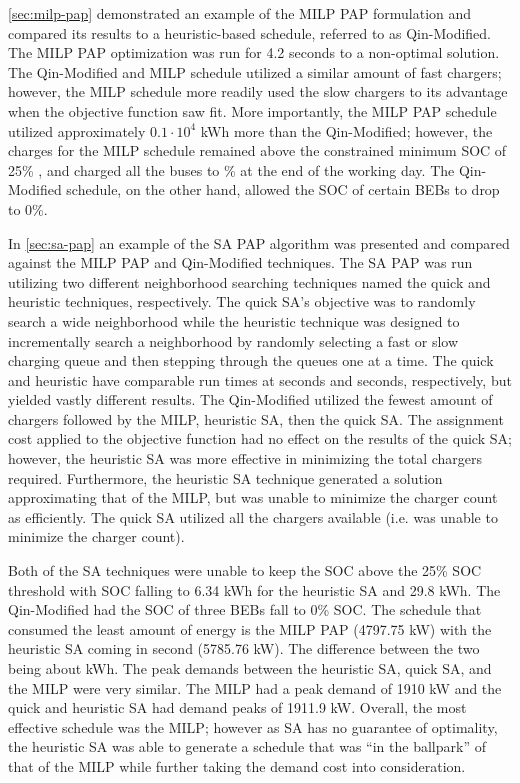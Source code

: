 \documentclass[ee,thesis]{usuthesis}
\newcommand{\bcharge}{0.7 }                                                     %
\newcommand{\mincharge}{25\% }                                                  %
\newcommand{\tempcnt}{9101 }                                                    %
\newcommand{\quicklocal}{0.25 }                                                %
\newcommand{\heuristiclocal}{0.4 }                                             %
\newcommand{\timeran}{4.2 }                                                    %
\begin{document}
\ref{sec:milp-pap} demonstrated an example of the MILP PAP formulation and compared its results to a heuristic-based
schedule, referred to as Qin-Modified. The MILP PAP optimization was run for \timeran seconds to a non-optimal solution.
The Qin-Modified and MILP schedule utilized a similar amount of fast chargers; however, the MILP schedule more readily
used the slow chargers to its advantage when the objective function saw fit. More importantly, the MILP PAP schedule
utilized approximately \(0.1\cdot10^4\) kWh more than the Qin-Modified; however, the charges for the MILP schedule remained
above the constrained minimum SOC of \mincharge, and charged all the buses to \fpeval{\bcharge *100}\% at the end of the
working day. The Qin-Modified schedule, on the other hand, allowed the SOC of certain BEBs to drop to 0\%.

In \ref{sec:sa-pap} an example of the SA PAP algorithm was presented and compared against the MILP PAP and Qin-Modified
techniques. The SA PAP was run utilizing two different neighborhood searching techniques named the quick and heuristic
techniques, respectively. The quick SA's objective was to randomly search a wide neighborhood while the heuristic
technique was designed to incrementally search a neighborhood by randomly selecting a fast or slow charging queue and
then stepping through the queues one at a time. The quick and heuristic have comparable run times at
\fpeval{\quicklocal * \tempcnt} seconds and \fpeval{\heuristiclocal * \tempcnt} seconds,
respectively, but yielded vastly different results. The Qin-Modified utilized the fewest amount of chargers followed by
the MILP, heuristic SA, then the quick SA. The assignment cost applied to the objective function had no effect on the
results of the quick SA; however, the heuristic SA was more effective in minimizing the total chargers required.
Furthermore, the heuristic SA technique generated a solution approximating that of the MILP, but was unable to minimize
the charger count as efficiently. The quick SA utilized all the chargers available (i.e. was unable to minimize the
charger count).

Both of the SA techniques were unable to keep the SOC above the 25\% SOC threshold with SOC falling to 6.34 kWh for the
heuristic SA and 29.8 kWh. The Qin-Modified had the SOC of three BEBs fall to 0\% SOC. The schedule that consumed the
least amount of energy is the MILP PAP (4797.75 kW) with the heuristic SA coming in second (5785.76 kW). The difference
between the two being about  kWh. The peak demands between the heuristic SA, quick
SA, and the MILP were very similar. The MILP had a peak demand of 1910 kW and the quick and heuristic SA had demand
peaks of 1911.9 kW. Overall, the most effective schedule was the MILP; however as SA has no guarantee of optimality, the
heuristic SA was able to generate a schedule that was ``in the ballpark'' of that of the MILP while further taking the
demand cost into consideration.
\end{document}
